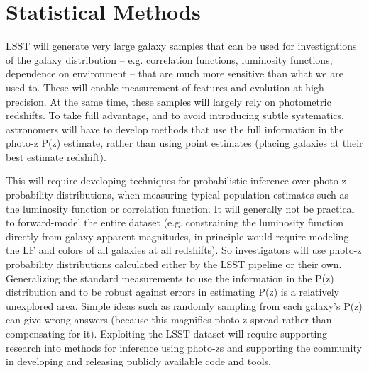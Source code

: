 
\section{Statistical Methods}
\label{sec:stats}


LSST will generate very large galaxy samples that can be used for
investigations of the galaxy distribution -- e.g. correlation
functions, luminosity functions, dependence on environment -- that are
much more sensitive than what we are used to. These will enable
measurement of features and evolution at high precision. At the same
time, these samples will largely rely on photometric redshifts. To
take full advantage, and to avoid introducing subtle systematics,
astronomers will have to develop methods that use the full information
in the photo-z P(z) estimate, rather than using point estimates
(placing galaxies at their best estimate redshift).

This will require developing techniques for probabilistic inference
over photo-z probability distributions, when measuring typical
population estimates such as the luminosity function or correlation
function. It will generally not be practical to forward-model the
entire dataset (e.g. constraining the luminosity function directly
from galaxy apparent magnitudes, in principle would require modeling
the LF and colors of all galaxies at all redshifts). So investigators
will use photo-z probability distributions calculated either by the
LSST pipeline or their own.  Generalizing the standard measurements to
use the information in the P(z) distribution and to be robust against
errors in estimating P(z) is a relatively unexplored area. Simple
ideas such as randomly sampling from each galaxy's P(z) can give wrong
answers (because this magnifies photo-z spread rather than
compensating for it). Exploiting the LSST dataset will require
supporting research into methods for inference using photo-zs and
supporting the community in developing and releasing publicly
available code and tools.
